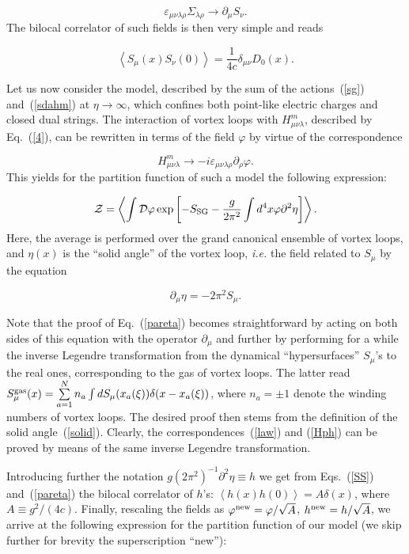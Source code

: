 \documentclass[a4paper,12pt]{article}
\begin{document}
\begin{equation}
\label{law}
\varepsilon_{\mu\nu\lambda\rho}\Sigma_{\lambda\rho}\to
\partial_\mu S_\nu.
\end{equation}
The bilocal correlator of such fields is then very simple and reads

\begin{equation}
\label{SS}
\left<S_\mu(x)S_\nu(0)\right>=\frac{1}{4c}\delta_{\mu\nu}D_0(x).
\end{equation}

Let us now consider the model, described by the sum of the actions~(\ref{sg}) 
and~(\ref{sdahm}) at $\eta\to\infty$, 
which confines both point-like electric charges and closed dual strings. 
The interaction of vortex loops with $H_{\mu\nu\lambda}^m$, described by Eq.~(\ref{4}),
can be rewritten in terms of the field $\varphi$ by virtue of the correspondence 

\begin{equation}
\label{Hph}
H_{\mu\nu\lambda}^m
\to-i\varepsilon_{\mu\nu\lambda\rho}\partial_\rho\varphi.
\end{equation}  
This yields for the partition function 
of such a model the following expression:

$${\cal Z}=\left<\int {\cal D}\varphi\exp\left[-S_{\rm SG}
-\frac{g}{2\pi^2}\int d^4x\varphi\partial^2\eta\right]\right>.$$
Here, the average is performed over the 
grand canonical ensemble of vortex loops, and $\eta(x)$ is the ``solid angle'' of the vortex loop, {\it i.e.}
the field related to $S_\mu$ by the equation 

\begin{equation}
\label{pareta}
\partial_\mu\eta=-2\pi^2S_\mu.
\end{equation} 

Note that the proof of Eq.~(\ref{pareta})
becomes straightforward by acting on both sides of this equation with the operator $\partial_\mu$ and further by 
performing for a while the inverse Legendre transformation from the 
dynamical ``hypersurfaces'' $S_\mu$'s to the real ones, corresponding to the gas of vortex loops.
The latter read $S_\mu^{\rm gas}(x)=\sum\limits_{a=1}^{N}n_a\int dS_\mu(x_a(\xi))\delta(x-x_a(\xi))$,
where $n_a=\pm 1$ denote the winding numbers of vortex loops. The desired proof then stems from the definition 
of the solid angle~(\ref{solid}). Clearly, the correspondences~(\ref{law}) and (\ref{Hph}) 
can be proved by means of the same inverse Legendre transformation.

Introducing further the notation $g(2\pi^2)^{-1}\partial^2\eta\equiv h$
we get from Eqs.~(\ref{SS}) and~(\ref{pareta}) the bilocal correlator of $h$'s:
$\left<h(x)h(0)\right>=A\delta(x)$, where $A\equiv g^2/(4c)$. Finally, rescaling the 
fields as $\varphi^{\rm new}=\varphi/\sqrt{A}$, $h^{\rm new}=h/\sqrt{A}$, we 
arrive at the following expression for the partition function of our model (we skip further for brevity the superscription ``new''):
\end{document}
